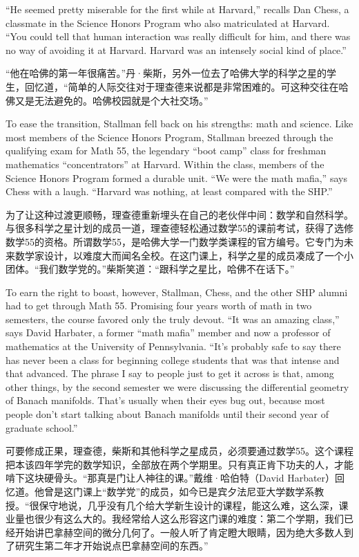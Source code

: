 \ifdefined\eng
``He seemed pretty miserable for the first while at Harvard,'' recalls Dan Chess, a classmate in the Science Honors Program who also matriculated at Harvard. ``You could tell that human interaction was really difficult for him, and there was no way of avoiding it at Harvard. Harvard was an intensely social kind of place.''
\fi

\ifdefined\chs
``他在哈佛的第一年很痛苦。''丹·柴斯，另外一位去了哈佛大学的科学之星的学生，回忆道，``简单的人际交往对于理查德来说都是非常困难的。可这种交往在哈佛又是无法避免的。哈佛校园就是个大社交场。''
\fi

\ifdefined\eng
To ease the transition, Stallman fell back on his strengths: math and science. Like most members of the Science Honors Program, Stallman breezed through the qualifying exam for Math 55, the legendary ``boot camp'' class for freshman mathematics ``concentrators'' at Harvard. Within the class, members of the Science Honors Program formed a durable unit. ``We were the math mafia,'' says Chess with a laugh. ``Harvard was nothing, at least compared with the SHP.''
\fi

\ifdefined\chs
为了让这种过渡更顺畅，理查德重新埋头在自己的老伙伴中间：数学和自然科学。与很多科学之星计划的成员一道，理查德轻松通过数学55的课前考试，获得了选修数学55的资格。所谓数学55，是哈佛大学一门数学类课程的官方编号。它专门为未来数学家设计，以难度大而闻名全校。在这门课上，科学之星的成员凑成了一个小团体。``我们数学党的。''柴斯笑道：``跟科学之星比，哈佛不在话下。''
\fi

\ifdefined\eng
To earn the right to boast, however, Stallman, Chess, and the other SHP alumni had to get through Math 55. Promising four years worth of math in two semesters, the course favored only the truly devout. ``It was an amazing class,'' says David Harbater, a former ``math mafia'' member and now a professor of mathematics at the University of Pennsylvania. ``It's probably safe to say there has never been a class for beginning college students that was that intense and that advanced. The phrase I say to people just to get it across is that, among other things, by the second semester we were discussing the differential geometry of Banach manifolds. That's usually when their eyes bug out, because most people don't start talking about Banach manifolds until their second year of graduate school.''
\fi

\ifdefined\chs
可要修成正果，理查德，柴斯和其他科学之星成员，必须要通过数学55。这个课程把本该四年学完的数学知识，全部放在两个学期里。只有真正肯下功夫的人，才能啃下这块硬骨头。``那真是门让人神往的课。''戴维·哈伯特（David Harbater）回忆道。他曾是这门课上``数学党''的成员，如今已是宾夕法尼亚大学数学系教授。``很保守地说，几乎没有几个给大学新生设计的课程，能这么难，这么深，课业量也很少有这么大的。我经常给人这么形容这门课的难度：第二个学期，我们已经开始讲巴拿赫空间的微分几何了。一般人听了肯定瞪大眼睛，因为绝大多数人到了研究生第二年才开始说点巴拿赫空间的东西。''
\fi

